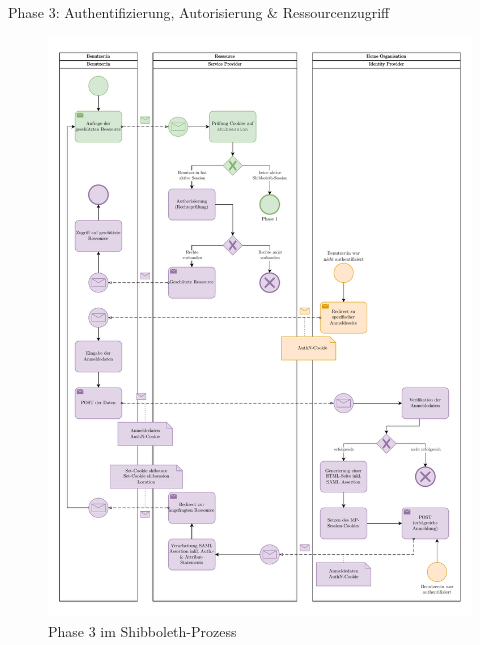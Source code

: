 \begin{frame}{Phase 3: Authentifizierung, Autorisierung \& Ressourcenzugriff}
    \begin{figure}
        \includegraphics[height=0.7\paperheight]{../assets/bis_bpmn_phase_3.drawio.pdf}
        \caption{Phase 3 im Shibboleth-Prozess~\cite[vgl.][]{switchExpertDemoSWITCHaai2024a}}
    \end{figure}
\end{frame}
